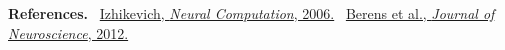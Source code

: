 \documentclass[11pt]{article}
\begin{document}


\textbf{References.} %
\cite{Izhikevich06}~\href{http://izhikevich.org/publications/spnet.htm}{Izhikevich, \emph{Neural Computation}, 2006.}
\cite{berens_fast_2012}~\href{https://www.jneurosci.org/content/32/31/10618}{Berens et al., \emph{Journal of Neuroscience}, 2012.}
\end{document}
